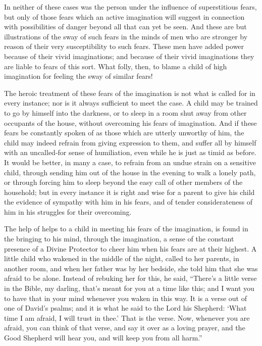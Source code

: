 \documentclass[
]{book}
\begin{document}
In neither of these cases was the person under the influence of superstitious fears, but only of those fears which an active imagination will suggest in connection with possibilities of danger beyond all that can yet be seen. And these are but illustrations of the sway of such fears in the minds of men who are stronger by reason of their very susceptibility to such fears. These men have added power because of their vivid imaginations; and because of their vivid imaginations they are liable to fears of this sort. What folly, then, to blame a child of high imagination for feeling the sway of similar fears!

The heroic treatment of these fears of the imagination is not what is called for in every instance; nor is it always sufficient to meet the case. A child may be trained to go by himself into the darkness, or to sleep in a room shut away from other occupants of the house, without overcoming his fears of imagination. And if these fears be constantly spoken of as those which are utterly unworthy of him, the child may indeed refrain from giving expression to them, and suffer all by himself with an uncalled-for sense of humiliation, even while he is just as timid as before. It would be better, in many a case, to refrain from an undue strain on a sensitive child, through sending him out of the house in the evening to walk a lonely path, or through forcing him to sleep beyond the easy call of other members of the household; but in every instance it is right and wise for a parent to give his child the evidence of sympathy with him in his fears, and of tender considerateness of him in his struggles for their overcoming.

The help of helps to a child in meeting his fears of the imagination, is found in the bringing to his mind, through the imagination, a sense of the constant presence of a Divine Protector to cheer him when his fears are at their highest. A little child who wakened in the middle of the night, called to her parents, in another room, and when her father was by her bedside, she told him that she was afraid to be alone. Instead of rebuking her for this, he said, ``There's a little verse in the Bible, my darling, that's meant for you at a time like this; and I want you to have that in your mind whenever you waken in this way. It is a verse out of one of David's psalms; and it is what he said to the Lord his Shepherd: `What time I am afraid, I will trust in thee.' That is the verse. Now, whenever you are afraid, you can think of that verse, and say it over as a loving prayer, and the Good Shepherd will hear you, and will keep you from all harm.''
\end{document}
